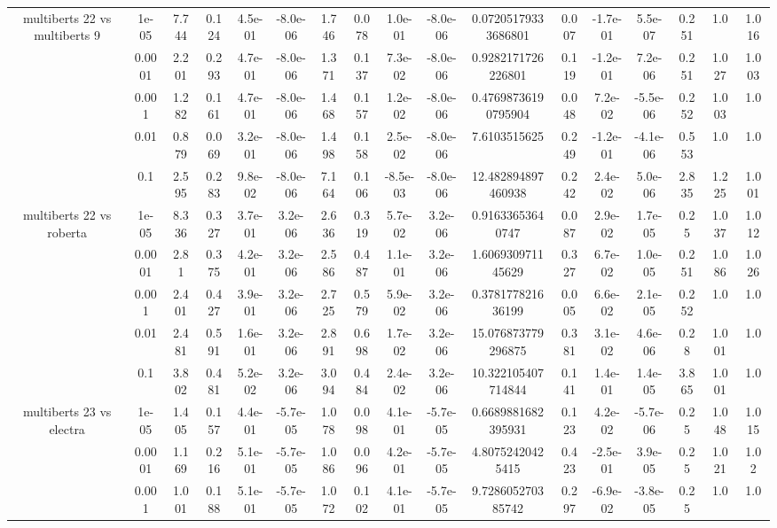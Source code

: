 \begin{tabular}{|c|c|c|c|c|c|c|c|c|c|c|c|c|c|c|c|c|}
\hline
\multirow{5}{*}{multiberts 22 vs multiberts 9} & 1e-05 & 7.744 & 0.124 & 4.5e-01 & -8.0e-06 & 1.746 & 0.078 & 1.0e-01 & -8.0e-06 & 0.07205179333686801 & 0.007 & -1.7e-01 & 5.5e-07 & 0.251 & 1.0 & 1.016 \\
 & 0.0001 & 2.201 & 0.293 & 4.7e-01 & -8.0e-06 & 1.371 & 0.137 & 7.3e-02 & -8.0e-06 & 0.9282171726226801 & 0.119 & -1.2e-01 & 7.2e-06 & 0.251 & 1.027 & 1.003 \\
 & 0.001 & 1.282 & 0.161 & 4.7e-01 & -8.0e-06 & 1.468 & 0.157 & 1.2e-02 & -8.0e-06 & 0.47698736190795904 & 0.048 & 7.2e-02 & -5.5e-06 & 0.252 & 1.003 & 1.0 \\
 & 0.01 & 0.879 & 0.069 & 3.2e-01 & -8.0e-06 & 1.498 & 0.158 & 2.5e-02 & -8.0e-06 & 7.6103515625 & 0.249 & -1.2e-01 & -4.1e-06 & 0.553 & 1.0 & 1.0 \\
 & 0.1 & 2.595 & 0.283 & 9.8e-02 & -8.0e-06 & 7.164 & 0.106 & -8.5e-03 & -8.0e-06 & 12.482894897460938 & 0.242 & 2.4e-02 & 5.0e-06 & 2.835 & 1.225 & 1.001 \\
\hline
\multirow{5}{*}{multiberts 22 vs roberta } & 1e-05 & 8.336 & 0.327 & 3.7e-01 & 3.2e-06 & 2.636 & 0.319 & 5.7e-02 & 3.2e-06 & 0.91633653640747 & 0.087 & 2.9e-02 & 1.7e-05 & 0.25 & 1.037 & 1.012 \\
 & 0.0001 & 2.81 & 0.375 & 4.2e-01 & 3.2e-06 & 2.586 & 0.487 & 1.1e-01 & 3.2e-06 & 1.606930971145629 & 0.327 & 6.7e-02 & 1.0e-05 & 0.251 & 1.086 & 1.026 \\
 & 0.001 & 2.401 & 0.427 & 3.9e-01 & 3.2e-06 & 2.725 & 0.579 & 5.9e-02 & 3.2e-06 & 0.378177821636199 & 0.005 & 6.6e-02 & 2.1e-05 & 0.252 & 1.0 & 1.0 \\
 & 0.01 & 2.481 & 0.591 & 1.6e-01 & 3.2e-06 & 2.891 & 0.698 & 1.7e-02 & 3.2e-06 & 15.076873779296875 & 0.381 & 3.1e-02 & 4.6e-06 & 0.28 & 1.001 & 1.0 \\
 & 0.1 & 3.802 & 0.481 & 5.2e-02 & 3.2e-06 & 3.094 & 0.484 & 2.4e-02 & 3.2e-06 & 10.322105407714844 & 0.141 & 1.4e-01 & 1.4e-05 & 3.865 & 1.001 & 1.0 \\
\hline
\multirow{5}{*}{multiberts 23 vs electra } & 1e-05 & 1.405 & 0.157 & 4.4e-01 & -5.7e-05 & 1.078 & 0.098 & 4.1e-01 & -5.7e-05 & 0.6689881682395931 & 0.123 & 4.2e-02 & -5.7e-06 & 0.25 & 1.048 & 1.015 \\
 & 0.0001 & 1.169 & 0.216 & 5.1e-01 & -5.7e-05 & 1.086 & 0.096 & 4.2e-01 & -5.7e-05 & 4.80752420425415 & 0.423 & -2.5e-01 & 3.9e-05 & 0.25 & 1.021 & 1.02 \\
 & 0.001 & 1.001 & 0.188 & 5.1e-01 & -5.7e-05 & 1.072 & 0.102 & 4.1e-01 & -5.7e-05 & 9.728605270385742 & 0.297 & -6.9e-02 & -3.8e-05 & 0.25 & 1.0 & 1.0 \\

\end{tabular}

